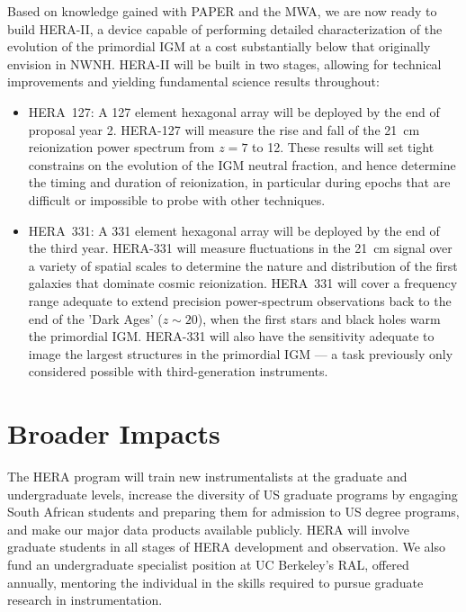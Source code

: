 \documentclass[preprint]{aastex}
\begin{document}
Based on knowledge gained with PAPER and the MWA, we are now ready to build HERA-II, a device
capable of performing detailed characterization of the evolution of the primordial IGM at
a cost substantially below that originally envision in NWNH. HERA-II will be built in two stages, 
allowing for technical improvements and yielding fundamental science results throughout:


\begin{itemize}[noitemsep,nolistsep]

\item HERA~127: A 127 element hexagonal array will be deployed by
the end of proposal year 2. HERA-127 will measure the rise and fall of the
21~cm reionization power spectrum from $z = 7$ to 12. These results will set tight
constrains on the evolution of the IGM neutral fraction, and hence determine
the timing and duration of reionization, in particular during epochs that are difficult or impossible to
probe with other techniques.

\item HERA~331: A 331 element hexagonal array will be deployed by the end of the third year. HERA-331
will measure fluctuations in the 21~cm signal over a variety of spatial
scales to determine the nature and distribution of the first galaxies
that dominate cosmic reionization. HERA~331 will cover a frequency range adequate to extend precision
power-spectrum observations back to the end of the 'Dark Ages' ($z \sim 20$),
when the first stars and black holes warm the primordial IGM. HERA-331 will also have the
sensitivity adequate to image the largest structures in the primordial
IGM --- a task previously only considered possible with third-generation
instruments. 

\end{itemize}

\section*{Broader Impacts}

The HERA program will train new instrumentalists at the graduate and undergraduate levels, increase the
diversity of US graduate programs by engaging South African students and
preparing them for admission to US degree programs, and make our major data
products available publicly. HERA will involve graduate students in all
stages of HERA development and observation. We also fund an
undergraduate specialist position
at UC Berkeley's RAL, offered annually,
mentoring the individual in the skills required to pursue graduate
research in instrumentation.
\end{document}
